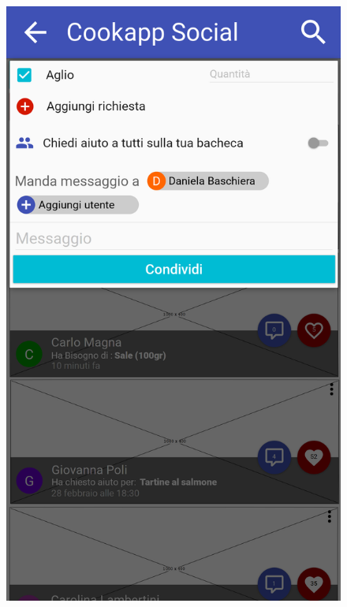 \begin{figure}[H]
	\begin{minipage}{.49\textwidth}
		\includegraphics[width=\textwidth]{img/wireframe/chiedi_aiuto_social_selezionato_aglio_utente.png}
	\end{minipage}
	\begin{minipage}{.49\textwidth}

\end{minipage}
\end{figure}
